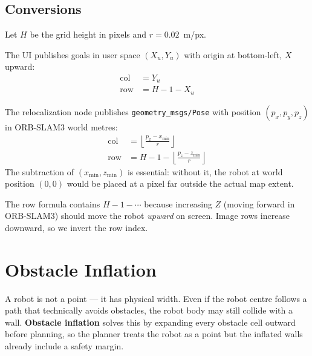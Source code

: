 \documentclass[12pt,a4paper]{article}
\begin{document}
\subsection{Conversions}

Let $H$ be the grid height in pixels and $r = 0.02$~m/px.

\begin{tcolorbox}[formulabox, title={User Space $\to$ Pixel Space}]
The UI publishes goals in user space $(X_u, Y_u)$ with origin at
bottom-left, $X$ upward:
\begin{align}
  \mathrm{col} &= Y_u \\
  \mathrm{row} &= H - 1 - X_u
\end{align}
\end{tcolorbox}

\begin{tcolorbox}[formulabox, title={ORB-SLAM3 World $\to$ Pixel Space}]
The relocalization node publishes \texttt{geometry\_msgs/Pose} with
position $(p_x, p_y, p_z)$ in ORB-SLAM3 world metres:
\begin{align}
  \mathrm{col} &= \left\lfloor \frac{p_x - x_{\min}}{r} \right\rfloor \\
  \mathrm{row} &= H - 1 - \left\lfloor \frac{p_z - z_{\min}}{r} \right\rfloor
\end{align}
The subtraction of $(x_{\min}, z_{\min})$ is essential: without it, the
robot at world position $(0,0)$ would be placed at a pixel far outside the
actual map extent.
\end{tcolorbox}

\begin{tcolorbox}[notebox]
  The row formula contains $H - 1 - \cdots$ because increasing $Z$
  (moving forward in ORB-SLAM3) should move the robot \emph{upward} on
  screen. Image rows increase downward, so we invert the row index.
\end{tcolorbox}

\section{Obstacle Inflation}

A robot is not a point --- it has physical width. Even if the robot centre
follows a path that technically avoids obstacles, the robot body may still
collide with a wall. \textbf{Obstacle inflation} solves this by expanding
every obstacle cell outward before planning, so the planner treats the robot
as a point but the inflated walls already include a safety margin.
\end{document}
